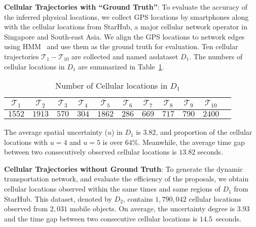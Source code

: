 \documentclass{vldb}
\begin{document}
	\textbf{Cellular Trajectories with ``Ground Truth''}: To evaluate the accuracy of the inferred physical locations, we collect GPS locations by smartphones along with the cellular locations 
	from StarHub, a major cellular network operator in Singapore and South-east Asia. We align the GPS locations to network edges using HMM~\cite{newson2009hidden} and use them  
	as the ground truth for evaluation.
	Ten cellular trajectories $\mathcal{T}_1-\mathcal{T}_{10}$ are collected and named asdataset $D_1$.	The numbers of cellular locations in $D_1$ are summarized in Table~\ref{table:trajs}.
	
	
	\begin{table}[!htb]
		\centering
		\scriptsize
		\begin{tabular}{|c|c|c|c|c|c|c|c|c|c|c|}
			\hline
			$\mathcal{T}_1$ & $\mathcal{T}_2$ & $\mathcal{T}_3$ & $\mathcal{T}_4$  & $\mathcal{T}_5$ & $\mathcal{T}_6$ & $\mathcal{T}_7$ & $\mathcal{T}_8$ & $\mathcal{T}_{9}$ & $\mathcal{T}_{10}$ \\
			\hline
			$1552$ & $1913$ & $570$ & $304$ & $1862$ & $286$ & $669$ & $717$ & $790$ & $2400$ \\
			\hline
		\end{tabular}
		\vspace{-6pt}
		\caption{Number of Cellular locations in $D_1$}\label{table:trajs}
		\vspace{-10pt}
	\end{table}
	
	
	The average spatial uncertainty ($u$) in $D_1$ is $3.82$, and proportion of the cellular locations with $u=4$ and $u=5$ is over $64\%$.
	Meanwhile, the average time gap between two consecutively observed cellular locations is $13.82$ seconds.
		
	\textbf{Cellular Trajectories without Ground Truth}: To generate the dynamic transportation network, and evaluate the efficiency of the proposals, we obtain 
	cellular locations observed within the same times and same regions of $D_1$ from StarHub.
	This dataset, denoted by $D_2$, contains $1,790,042$ cellular locations observed from $2,031$ mobile objects.
	On average, the uncertainty degree is $3.93$ and the time gap between two consecutive cellular locations is $14.5$~seconds.
	
\end{document}
